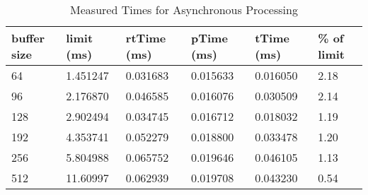 \begin{table}[H]
\begin{center}
\begin{tabular}{ |p{1.4cm}||p{1.5cm}|p{1.7cm}|p{1.7cm}|p{1.6cm}|p{1.4cm}|  }
 \hline
 buffer size    & limit (ms)    & rtTime (ms)   & pTime (ms)    & tTime (ms) & \% of limit\\
 \hline
 64             & 1.451247      & 0.031683          & 0.015633          & 0.016050      & 2.18 \\
 96             & 2.176870      & 0.046585          & 0.016076          & 0.030509      & 2.14 \\
 128            & 2.902494      & 0.034745          & 0.016712          & 0.018032      & 1.19 \\
 192            & 4.353741      & 0.052279          & 0.018800          & 0.033478      & 1.20 \\
 256            & 5.804988      & 0.065752          & 0.019646          & 0.046105      & 1.13 \\
 512            & 11.60997      & 0.062939          & 0.019708          & 0.043230      & 0.54 \\
 \hline
\end{tabular}
\end{center}
\caption{Measured Times for Asynchronous Processing}
\label{tab:latency_async}
\end{table}


